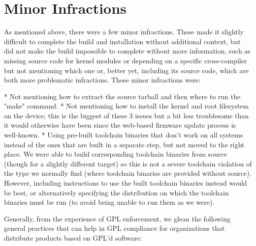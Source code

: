 \section{Minor Infractions}

As mentioned above, there were a few minor infractions.  These made it slightly
difficult to complete the build and installation without additional context, but
did not make the build impossible to complete without more information, such as
missing source code for kernel modules or depending on a specific cross-compiler
but not mentioning which one or, better yet, including its source code, which
are both more problematic infractions.  These minor infractions were:


* Not mentioning how to extract the source tarball and then where to run the
  "make" command.
* Not mentioning how to install the kernel and root filesystem on the device;
  this is the biggest of these 3 issues but a bit less troublesome than it would
  otherwise have been since the web-based firmware update process is well-known.
* Using pre-built toolchain binaries that don't work on all systems instead of
  the ones that are built in a separate step, but not moved to the right place.
  We were able to build corresponding toolchain binaries from source (though
  for a slightly different target) so this is not a severe toolchain violation
  of the type we normally find (where toolchain binaries are provided without
  source).  However, including instructions to use the built toolchain binaries
  instead would be best, or alternatively specifying the distribution on which
  the toolchain binaries must be run (to avoid being unable to run them as we
  were).



Generally, from the experience of GPL enforcement, we glean the following
general practices that can help in GPL compliance for organizations that
distribute products based on GPL'd software:

